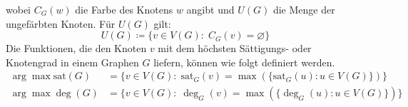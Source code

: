 wobei $C_G(w)$ die Farbe des Knotens $w$ angibt und $U(G)$ die Menge der ungefärbten Knoten. Für $U(G)$ gilt:
\begin{equation*}
    U(G)\coloneqq \{v \in V(G) \colon \;C_G(v) = \varnothing\}
\end{equation*}
Die Funktionen, die den Knoten $v$ mit dem höchsten Sättigungs- oder Knotengrad in einem Graphen $G$ liefern, können wie folgt definiert werden.
\begin{align*}
    \arg \max \text{sat}(G) &= \{v \in V(G) \colon \; \text{sat}_G(v) = \max(\{\text{sat}_G(u) \colon u \in V(G) \})\}\\
    \arg \max \deg(G) &= \{v \in V(G)\colon \; \deg_G(v) = \max(\{\deg_G(u) \colon u \in V(G)\}) \}
\end{align*}
